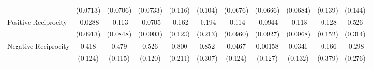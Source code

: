 {\begin{tabular}{l*{10}{c}}
            &    (0.0713)         &    (0.0706)         &    (0.0733)         &     (0.116)         &     (0.104)         &    (0.0676)         &    (0.0666)         &    (0.0684)         &     (0.139)         &     (0.144)         \\
\addlinespace
Positive Reciprocity&     -0.0288         &      -0.113         &     -0.0705         &      -0.162         &      -0.194         &      -0.114         &     -0.0944         &      -0.118         &      -0.128         &       0.526         \\
            &    (0.0913)         &    (0.0848)         &    (0.0903)         &     (0.123)         &     (0.213)         &    (0.0960)         &    (0.0927)         &    (0.0968)         &     (0.152)         &     (0.314)         \\
\addlinespace
Negative Reciprocity&       0.418\sym{***}&       0.479\sym{***}&       0.526\sym{***}&       0.800\sym{***}&       0.852\sym{**} &      0.0467         &     0.00158         &      0.0341         &      -0.166         &      -0.298         \\
            &     (0.124)         &     (0.115)         &     (0.120)         &     (0.211)         &     (0.307)         &     (0.124)         &     (0.127)         &     (0.132)         &     (0.379)         &     (0.276)         \\
\bottomrule
\end{tabular}
}
